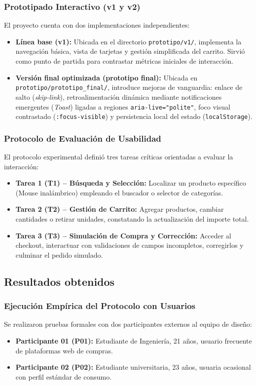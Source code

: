 \documentclass{article}
\begin{document}
\subsubsection{Prototipado Interactivo (v1 y v2)}
El proyecto cuenta con dos implementaciones independientes:
\begin{itemize}
    \item \textbf{Línea base (v1):} Ubicada en el directorio \texttt{prototipo/v1/}, implementa la navegación básica, vista de tarjetas y gestión simplificada del carrito. Sirvió como punto de partida para contrastar métricas iniciales de interacción.
    \item \textbf{Versión final optimizada (prototipo final):} Ubicada en \texttt{prototipo/prototipo\_final/}, introduce mejoras de vanguardia: enlace de salto (\textit{skip-link}), retroalimentación dinámica mediante notificaciones emergentes (\textit{Toast}) ligadas a regiones \texttt{aria-live="polite"}, foco visual contrastado (\texttt{:focus-visible}) y persistencia local del estado (\texttt{localStorage}).
\end{itemize}

\subsubsection{Protocolo de Evaluación de Usabilidad}
El protocolo experimental definió tres tareas críticas orientadas a evaluar la interacción:
\begin{itemize}
    \item \textbf{Tarea 1 (T1) -- Búsqueda y Selección:} Localizar un producto específico (Mouse inalámbrico) empleando el buscador o selector de categorías.
    \item \textbf{Tarea 2 (T2) -- Gestión de Carrito:} Agregar productos, cambiar cantidades o retirar unidades, constatando la actualización del importe total.
    \item \textbf{Tarea 3 (T3) -- Simulación de Compra y Corrección:} Acceder al checkout, interactuar con validaciones de campos incompletos, corregirlos y culminar el pedido simulado.
\end{itemize}

\subsection{Resultados obtenidos}

\subsubsection{Ejecución Empírica del Protocolo con Usuarios}
Se realizaron pruebas formales con dos participantes externos al equipo de diseño:
\begin{itemize}
    \item \textbf{Participante 01 (P01):} Estudiante de Ingeniería, 21 años, usuario frecuente de plataformas web de compras.
    \item \textbf{Participante 02 (P02):} Estudiante universitaria, 23 años, usuaria ocasional con perfil estándar de consumo.
\end{itemize}
\end{document}
